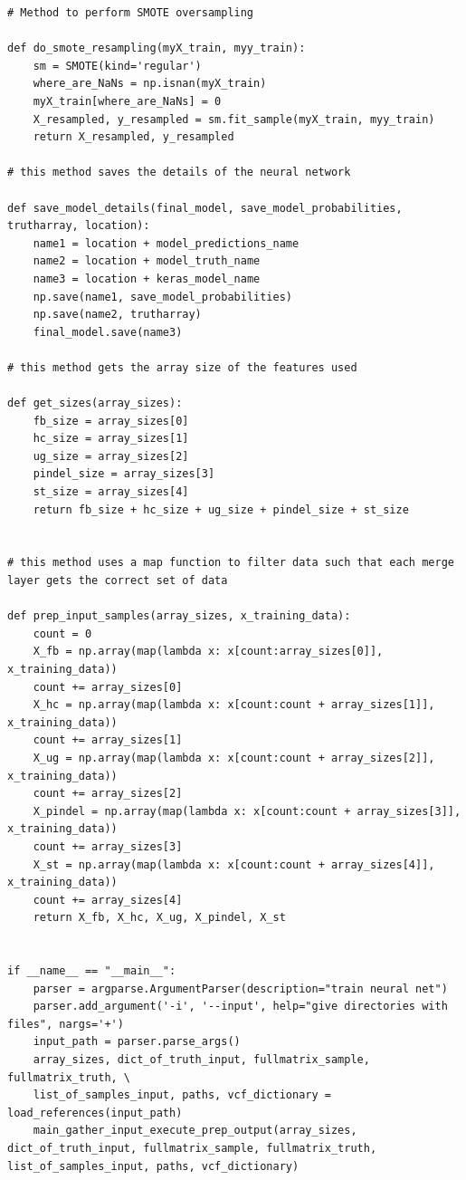 \documentclass{article}
\begin{document}
\begin{verbatim}
# Method to perform SMOTE oversampling

def do_smote_resampling(myX_train, myy_train):
    sm = SMOTE(kind='regular')
    where_are_NaNs = np.isnan(myX_train)
    myX_train[where_are_NaNs] = 0
    X_resampled, y_resampled = sm.fit_sample(myX_train, myy_train)
    return X_resampled, y_resampled

# this method saves the details of the neural network

def save_model_details(final_model, save_model_probabilities, trutharray, location):
    name1 = location + model_predictions_name
    name2 = location + model_truth_name
    name3 = location + keras_model_name
    np.save(name1, save_model_probabilities)
    np.save(name2, trutharray)
    final_model.save(name3)

# this method gets the array size of the features used

def get_sizes(array_sizes):
    fb_size = array_sizes[0]
    hc_size = array_sizes[1]
    ug_size = array_sizes[2]
    pindel_size = array_sizes[3]
    st_size = array_sizes[4]
    return fb_size + hc_size + ug_size + pindel_size + st_size

	
# this method uses a map function to filter data such that each merge layer gets the correct set of data

def prep_input_samples(array_sizes, x_training_data):
    count = 0
    X_fb = np.array(map(lambda x: x[count:array_sizes[0]], x_training_data))
    count += array_sizes[0]
    X_hc = np.array(map(lambda x: x[count:count + array_sizes[1]], x_training_data))
    count += array_sizes[1]
    X_ug = np.array(map(lambda x: x[count:count + array_sizes[2]], x_training_data))
    count += array_sizes[2]
    X_pindel = np.array(map(lambda x: x[count:count + array_sizes[3]], x_training_data))
    count += array_sizes[3]
    X_st = np.array(map(lambda x: x[count:count + array_sizes[4]], x_training_data))
    count += array_sizes[4]
    return X_fb, X_hc, X_ug, X_pindel, X_st


if __name__ == "__main__":
    parser = argparse.ArgumentParser(description="train neural net")
    parser.add_argument('-i', '--input', help="give directories with files", nargs='+')
    input_path = parser.parse_args()
    array_sizes, dict_of_truth_input, fullmatrix_sample, fullmatrix_truth, \
    list_of_samples_input, paths, vcf_dictionary = load_references(input_path)
    main_gather_input_execute_prep_output(array_sizes, dict_of_truth_input, fullmatrix_sample, fullmatrix_truth, list_of_samples_input, paths, vcf_dictionary)
\end{verbatim}
\end{document}
